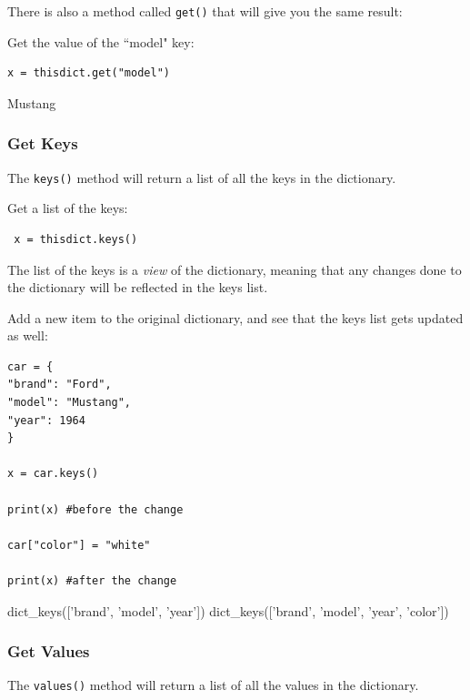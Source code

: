 \documentclass[12pt,a4paper]{article}
\newcommand{\code}[1]{%
	\colorbox{backcolour}{\lstinline{#1}}%
}
\begin{document}
There is also a method called \code{get()} that will give you the same result:

\begin{ebox}
Get the value of the ``model" key:
	\begin{lstlisting}
x = thisdict.get("model")
	\end{lstlisting}
\tcblower
	\begin{vercode}
Mustang
	\end{vercode}
\end{ebox}
\subsubsection{Get Keys}

The \code{keys()} method will return a list of all the keys in the dictionary.

\begin{ebox}
Get a list of the keys:
	\begin{lstlisting}
 x = thisdict.keys()
	\end{lstlisting}
\end{ebox}

The list of the keys is a \textit{view} of the dictionary, meaning that any changes done
to the dictionary will be reflected in the keys list.

\begin{ebox}
Add a new item to the original dictionary, and see that the keys list gets updated as well:
	\begin{lstlisting}
car = {
"brand": "Ford",
"model": "Mustang",
"year": 1964
}

x = car.keys()

print(x) #before the change

car["color"] = "white"

print(x) #after the change
	\end{lstlisting}
\tcblower
	\begin{vercode}
dict_keys(['brand', 'model', 'year'])
dict_keys(['brand', 'model', 'year', 'color'])
	\end{vercode}
\end{ebox}
\subsubsection{Get Values}

The \code{values()} method will return a list of all the values in the dictionary.
\end{document}

